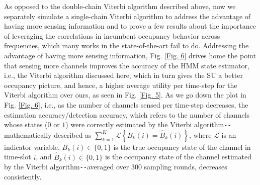 As opposed to the double-chain Viterbi algorithm described above, now we separately simulate a single-chain Viterbi algorithm to address the advantage of having more sensing information and to prove a few results about the importance of leveraging the correlations in incumbent occupancy behavior across frequencies, which many works in the state-of-the-art fail to do. Addressing the advantage of having more sensing information, Fig. \ref{Fig. 6} drives home the point that sensing more channels improves the accuracy of the HMM state estimator, i.e., the Viterbi algorithm discussed here, which in turn gives the SU a better occupancy picture, and hence, a higher average utility per time-step for the Viterbi algorithm over ours, as seen in Fig. \ref{Fig. 5}. As we go down the plot in Fig. \ref{Fig. 6}, i.e., as the number of channels sensed per time-step decreases, the estimation accuracy/detection accuracy, which refers to the number of channels whose states ($0$ or $1$) were correctly estimated by the Viterbi algorithm\texttt{-{}-}mathematically described as $\sum_{k{=}1}^{K}\mathcal{L}\left\{B_{k}(i){=}\hat{B}_{k}(i)\right\}$, where $\mathcal{L}$ is an indicator variable, $B_{k}(i){\in}\{0,1\}$ is the true occupancy state of the channel in time-slot $i$, and $\hat{B}_{k}(i){\in}\{0,1\}$ is the occupancy state of the channel estimated by the Viterbi algorithm\texttt{-{}-}averaged over $300$ sampling rounds, decreases consistently.


